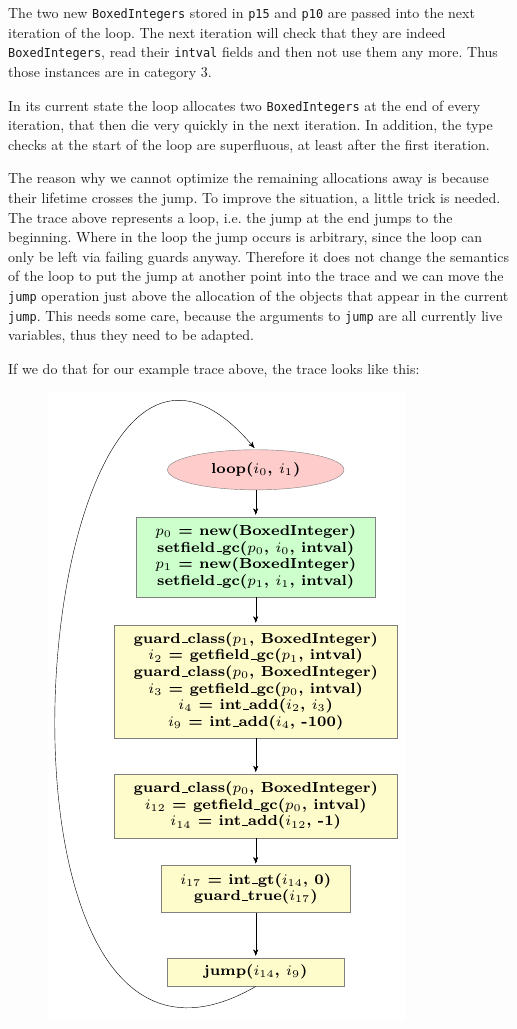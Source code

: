 \documentclass{sigplanconf}
\begin{document}
The two new \texttt{BoxedIntegers} stored in \texttt{p15} and \texttt{p10} are passed into
the next iteration of the loop. The next iteration will check that they are
indeed \texttt{BoxedIntegers}, read their \texttt{intval} fields and then not use them
any more. Thus those instances are in category 3.

In its current state the loop
allocates two \texttt{BoxedIntegers} at the end of every iteration, that then die
very quickly in the next iteration. In addition, the type checks at the start
of the loop are superfluous, at least after the first iteration.

The reason why we cannot optimize the remaining allocations away is because
their lifetime crosses the jump. To improve the situation, a little trick is
needed. The trace above represents a loop, i.e. the jump at the end jumps to
the beginning. Where in the loop the jump occurs is arbitrary, since the loop
can only be left via failing guards anyway. Therefore it does not change the
semantics of the loop to put the jump at another point into the trace and we
can move the \texttt{jump} operation just above the allocation of the objects that
appear in the current \texttt{jump}. This needs some care, because the arguments to
\texttt{jump} are all currently live variables, thus they need to be adapted.

If we do that for our example trace above, the trace looks like this:
\begin{figure}
\includegraphics{figures/step2.pdf}
\end{figure}
\end{document}

